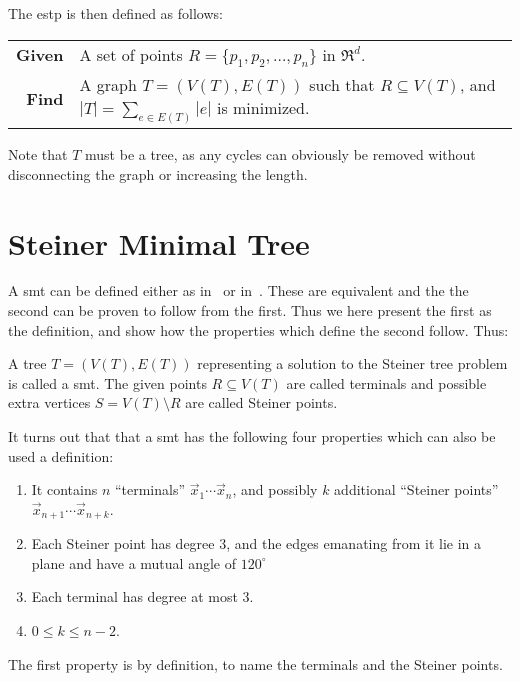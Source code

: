 The \gls{estp} is then defined as follows:
%
\begin{center}
  \begin{tabular}{rp{9cm}}
    \toprule
    \textbf{Given} & A set of points $R = \{ p_1, p_2, \ldots, p_n \}$ in
                     $\Re^d$. \\
    \textbf{Find} & A graph $T = (V(T), E(T))$ such that $R \subseteq V(T)$, and
                    $|T| = \sum_{e \in E(T)} |e|$ is minimized. \\
    \bottomrule
  \end{tabular}
\end{center}
%
Note that $T$ must be a tree, as any cycles can obviously be removed
without disconnecting the graph or increasing the length.

\section{Steiner Minimal Tree}
\label{sec:steiner-minimal-tree}

A \gls{smt} can be defined either as in~\textcite{brazil2015} or
in~\textcite{smith1992}. These are equivalent and the the second can be proven
to follow from the first. Thus we here present the first as the definition, and
show how the properties which define the second follow. Thus:
%
\begin{definition}
  A tree $T = (V(T), E(T))$ representing a solution to the Steiner tree problem
  is called a \acrlong{smt}. The given points $R \subseteq V(T)$ are called
  terminals and possible extra vertices $S = V(T) \setminus R$ are called
  Steiner points.
\end{definition}
%
It turns out that that a \gls{smt} has the following four properties which can
also be used a definition:
%
\begin{definition}
\leavevmode\vspace{-\baselineskip}\par
\begin{enumerate}
\item It contains $n$ ``terminals'' $\vec{x}_1 \cdots \vec{x}_n$, and
 possibly $k$ additional ``Steiner points'' $\vec{x}_{n+1} \cdots
 \vec{x}_{n+k}$.
\item Each Steiner point has degree $3$, and the edges emanating from it lie in a
 plane and have a mutual angle of $120^{\circ}$
\item Each terminal has degree at most $3$.
\item $0 \le k \le n-2$.
\end{enumerate}
\end{definition}
%
The first property is by definition, to name the terminals and the
Steiner points.

